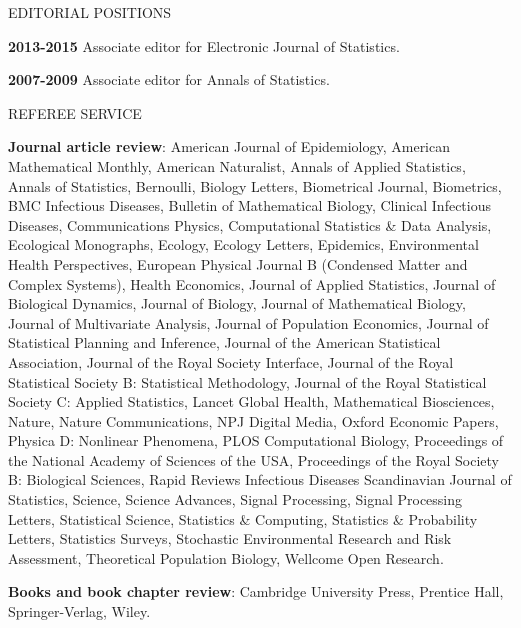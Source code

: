 \lsp
\begin{mylist}{EDITORIAL POSITIONS}
\item{\bf 2013-2015} Associate editor for Electronic Journal of Statistics.

\item{\bf 2007-2009} Associate editor for Annals of Statistics.

\end{mylist}

\lsp


\begin{mylist}{REFEREE SERVICE} %
\item {\bf Journal article review}: 
American Journal of Epidemiology,
American Mathematical Monthly,
American Naturalist,
Annals of Applied Statistics,
Annals of Statistics,
Bernoulli,
Biology Letters,
Biometrical Journal,
Biometrics,
BMC Infectious Diseases,
Bulletin of Mathematical Biology,
Clinical Infectious Diseases,
Communications Physics,
Computational Statistics \& Data Analysis,
Ecological Monographs,
Ecology,
Ecology Letters,
Epidemics,
Environmental Health Perspectives,
European Physical Journal B (Condensed Matter and Complex Systems),
Health Economics,
Journal of Applied Statistics,
Journal of Biological Dynamics,
Journal of Biology,
Journal of Mathematical Biology,
Journal of Multivariate Analysis,
Journal of Population Economics,
Journal of Statistical Planning and Inference,
Journal of the American Statistical Association, 
Journal of the Royal Society Interface,  
Journal of the Royal Statistical Society B: Statistical Methodology,
Journal of the Royal Statistical Society C: Applied Statistics,
Lancet Global Health,
Mathematical Biosciences,
Nature,
Nature Communications,
NPJ Digital Media,
Oxford Economic Papers,
Physica D: Nonlinear Phenomena,
PLOS Computational Biology,
Proceedings of the National Academy of Sciences of the USA,
Proceedings of the Royal Society B: Biological Sciences,
Rapid Reviews Infectious Diseases
Scandinavian Journal of Statistics,
Science,
Science Advances,
Signal Processing,
Signal Processing Letters,
Statistical Science,
Statistics \& Computing,
Statistics \& Probability Letters,
Statistics Surveys,
Stochastic Environmental Research and Risk Assessment,
Theoretical Population Biology,
Wellcome Open Research.

\item {\bf Books and book chapter review}:
Cambridge University Press, 
Prentice Hall,
 Springer-Verlag,  
 Wiley.


\end{mylist}
